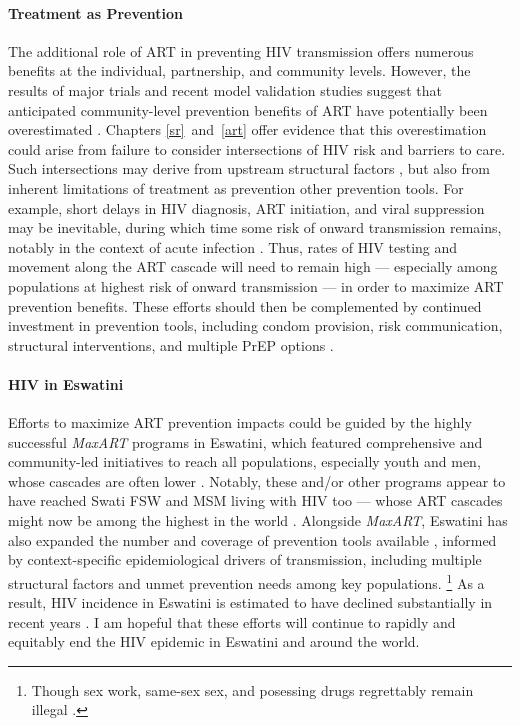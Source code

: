 \paragraph{Treatment as Prevention}
The additional role of ART in preventing HIV transmission offers numerous benefits
at the individual, partnership, and community levels.
However, the results of major trials and recent model validation studies suggest that
anticipated community-level prevention benefits of ART have potentially been overestimated
\cite{Eaton2015,Baral2019,Havlir2020}.
Chapters \ref{sr}~and~\ref{art} offer evidence that this overestimation could arise from
failure to consider intersections of HIV risk and barriers to care.
Such intersections may derive from upstream structural factors
\cite{Beyrer2012,Baral2013,Shannon2015,McBride2021},
but also from inherent limitations of treatment as prevention \vs other prevention tools.
For example, short delays in HIV diagnosis, ART initiation, and viral suppression may be inevitable,
during which time some risk of onward transmission remains,
notably in the context of acute infection \cite{Cohen2012}.
Thus, rates of HIV testing and movement along the ART cascade will need to remain high
--- especially among populations at highest risk of onward transmission ---
in order to maximize ART prevention benefits.
These efforts should then be complemented by continued investment in prevention tools,
including condom provision, risk communication, structural interventions, and multiple PrEP options
\cite{Eisinger2019tk}.
\paragraph{HIV in Eswatini}
Efforts to maximize ART prevention impacts could be guided by
the highly successful \emph{MaxART} programs in Eswatini,
which featured comprehensive and community-led initiatives to reach all populations,
especially youth and men, whose cascades are often lower \cite{MaxART1,MaxART2,Green2020}.
Notably, these and/or other programs appear to have reached
Swati FSW and MSM living with HIV too \cite{EswIBBS2022}
--- whose ART cascades might now be among the highest in the world \cite{AIDSinfo}.
Alongside \emph{MaxART}, Eswatini has also expanded
the number and coverage of prevention tools available \cite{NERCHA2014,NERCHA2018},
informed by context-specific epidemiological drivers of transmission,
including multiple structural factors and unmet prevention needs among key populations.%
\footnote{Though sex work, same-sex sex, and posessing drugs
  regrettably remain illegal \cite{UNAIDS2022lpa}.}
As a result, HIV incidence in Eswatini is estimated to have declined substantially in recent years
\cite{SHIMS1,SHIMS2,AIDSinfo}.
I am hopeful that these efforts will continue to rapidly and equitably end
the HIV epidemic in Eswatini and around the world.

